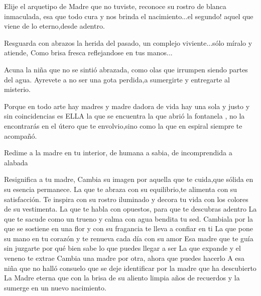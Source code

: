 \documentclass[12pt, a4paper, twoside]{book} %
\begin{document}
Elije el arquetipo de Madre que no tuviste, reconoce su rostro de blanca inmaculada, esa que todo cura y nos brinda el nacimiento...el segundo! aquel que viene de lo eterno,desde adentro.

Resguarda con abrazos la herida del pasado, un complejo viviente...sólo míralo y atiende,
Como brisa fresca reflejandose en tus manos...

Acuna la niña que no se sintió abrazada, como olas que irrumpen siendo partes del agua.
Ayrevete  a no ser  una gota perdida,a sumergirte y entregarte al misterio.

Porque en todo arte hay madres y madre dadora de vida hay una sola y justo y sin coincidencias es ELLA la que se encuentra la que abrió la fontanela , no la encontrarás en el  útero que te envolvio,sino como  la que en espiral siempre te acompañó.

Redime a la madre en tu interior, de humana a sabia, de incomprendida a alabada


Resignifica a tu madre,
Cambia su imagen por aquella que te cuida,que sólida en su esencia permanece.
La que te abraza con su equilibrio,te alimenta con su satisfacción.
Te inspira con su rostro iluminado y decora tu vida con los colores de su vestimenta.
La que te habla con opuestos, para que te descubras adentro
La que te sacude como un trueno y calma con agua bendita tu sed.
Cambiala por la que se sostiene en una flor y con su fragancia te lleva a confiar en ti
La que pone su mano en tu corazón y te renueva cada día con su amor
Esa madre que te guía sin juzgarte por qué bien sabe lo que puedes llegar a ser
La que expande y el veneno te extrae
Cambia una madre por otra, ahora que puedes hacerlo
A esa niña que no halló consuelo que se deje identificar por la madre que ha descubierto
La Madre eterna que con la brisa de su aliento limpia años de recuerdos y la sumerge en un nuevo nacimiento.
\end{document}
